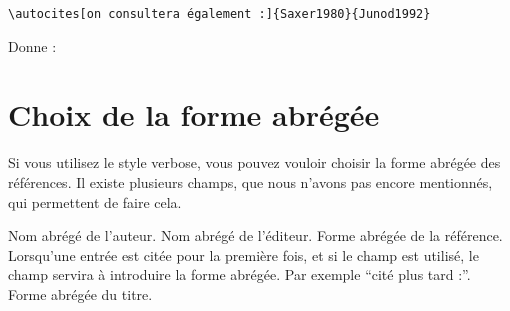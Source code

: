 \begin{verbatim}
\autocites[on consultera également :]{Saxer1980}{Junod1992}
\end{verbatim}

Donne :

\begin{quotation}
\cites[on consultera également :]{Saxer1980}{Junod1992}
\end{quotation}

\cite[24]{Junod1992}


\section{Choix de la forme abrégée}\label{shortfields}

Si vous utilisez le style verbose, vous pouvez vouloir choisir la forme abrégée des références. Il existe plusieurs champs, que nous n'avons pas encore mentionnés, qui permettent de faire cela.

\begin{fieldlist}
	 Nom abrégé de l'auteur.
	 Nom abrégé de l'éditeur.
	 Forme abrégée de la référence.
	 Lorsqu'une entrée est citée pour la première fois, et si le champ  est utilisé, le champ  servira à introduire la forme abrégée. Par exemple \enquote{cité plus tard :}.
	 Forme abrégée du titre.
\end{fieldlist}

